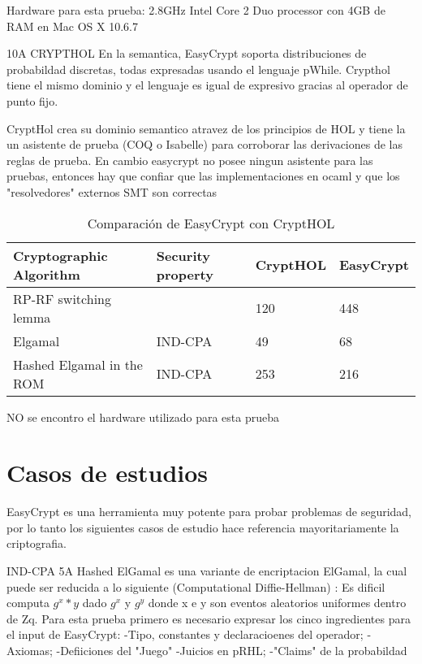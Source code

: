 \documentclass[runningheads,a4paper]{llncs}
\begin{document}
Hardware para esta prueba: 2.8GHz Intel Core 2 Duo processor con 4GB de RAM en Mac OS X 10.6.7

10A
\cite{article8}
CRYPTHOL
En la semantica, EasyCrypt soporta distribuciones de probabildad discretas, todas expresadas usando el lenguaje pWhile. Crypthol tiene el mismo dominio y el lenguaje es igual de expresivo gracias al operador de punto fijo.

CryptHol crea su dominio semantico atravez de los principios de HOL y tiene la un asistente de prueba (COQ o Isabelle) para corroborar las derivaciones de las reglas de prueba. En cambio easycrypt no posee ningun asistente para las pruebas, entonces hay que confiar que las implementaciones en ocaml y que los "resolvedores" externos SMT son correctas


\begin{table}
  \caption{Comparación de EasyCrypt con CryptHOL}
  \label{tab:simple1}
  \centering
  \begin{tabular}{ |p{4cm}|p{1.5cm}|p{1.5cm}|p{1.5cm}|  }
 \hline
 Cryptographic Algorithm & Security property & CryptHOL & EasyCrypt\\\cline{1-4}
 \hline
 RP-RF switching lemma &  & 120 & 448\\
 Elgamal & IND-CPA & 49  & 68\\
 Hashed Elgamal in the ROM & IND-CPA & 253 &  216\\
 \hline
\end{tabular}
\end{table}


NO se encontro el hardware utilizado para esta prueba




\section{Casos de estudios}
EasyCrypt es una herramienta muy potente para probar problemas de seguridad, por lo tanto los siguientes casos de estudio hace referencia mayoritariamente la criptografia.

IND-CPA  5A
\cite{article5}
Hashed ElGamal es una variante de encriptacion ElGamal, la cual puede ser reducida a lo siguiente (Computational Diffie-Hellman) : Es dificil computa $g^x*y$ dado $g^x$ y $g^y$ donde x e y son eventos aleatorios uniformes dentro de Zq.
Para esta prueba primero es necesario expresar los cinco ingredientes para el input de EasyCrypt:
-Tipo, constantes y declaracioenes del operador;
-Axiomas;
-Defiiciones del "Juego"
-Juicios en pRHL;
-"Claims" de la probabildad
\end{document}
